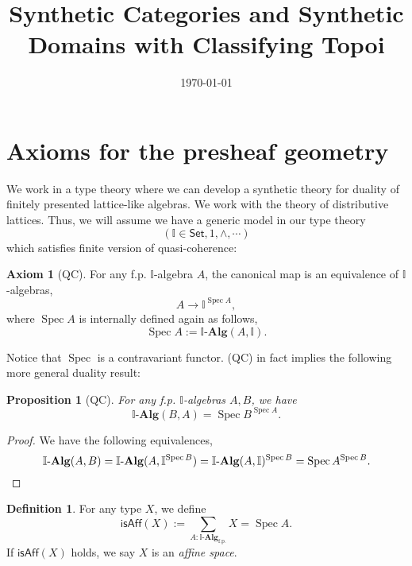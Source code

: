 \documentclass[12pt]{amsart}
\title{Synthetic Categories and Synthetic Domains with Classifying Topoi}
\date{\today}
\newtheorem{proposition}[theorem]{Proposition}
\theoremstyle{definition}
\newtheorem{definition}[theorem]{Definition}
\newtheorem{axiom}{Axiom}
\newcommand{\mb}[1]{\mathbf{#1}}
\newcommand{\mbb}[1]{\mathbb{#1}}
\newcommand{\I}{\mbb I}
\newcommand{\mr}[1]{\mathrm{#1}}
\newcommand{\ms}[1]{\mathsf{#1}}
\newcommand{\alg}{\text{-}\mb{Alg}}
\newcommand{\fp}{_{\mr{f.p.}}}
\newcommand{\st}{\ms{Set}}
\newcommand{\spec}{\operatorname{Spec}}
\begin{document}
%

%
%

%
%

%
\maketitle              %
%


\section{Axioms for the presheaf geometry}

We work in a type theory where we can develop a synthetic theory for duality of finitely presented lattice-like algebras. We work with the theory of distributive lattices. Thus, we will assume we have a generic model in our type theory
\[ (\I\in\st,1,\wedge,\cdots) \]
which satisfies finite version of quasi-coherence:

\begin{axiom}[QC]\label{ax:null}
  For any f.p. $\I$-algebra $A$, the canonical map is an equivalence of $\I$-algebras,
  \[ A \to \I^{\spec A}, \]
  where $\spec A$ is internally defined again as follows,
  \[ \spec A := \I\alg(A,\I). \]
\end{axiom}

Notice that $\spec$ is a contravariant functor. (QC) in fact implies the following more general duality result:

\begin{proposition}[QC]\label{prop:duality}
  For any f.p. $\I$-algebras $A,B$, we have
  \[ \I\alg(B,A) = \spec B^{\spec A}. \]
\end{proposition}
\begin{proof}
  We have the following equivalences,
  \[ \I\alg(A,B) = \I\alg(A,\I^{\spec B}) = \I\alg(A,\I)^{\spec B} = \spec A^{\spec B}. \qedhere \]
\end{proof}

\begin{definition}
  For any type $X$, we define
  \[ \ms{isAff}(X) := \sum_{A:\I\alg\fp} X = \spec A. \]
  If $\ms{isAff}(X)$ holds, we say $X$ is an \emph{affine space}.
\end{definition}
\end{document}
